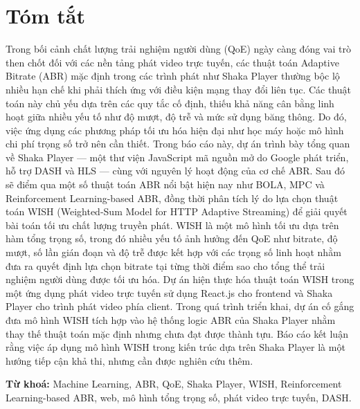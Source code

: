 \documentclass[12pt]{report}
\begin{document}
\chapter*{Tóm tắt}
Trong bối cảnh chất lượng trải nghiệm người dùng (QoE) ngày càng đóng vai trò then chốt đối với các nền tảng phát video trực tuyến, các thuật toán Adaptive Bitrate (ABR) mặc định trong các trình phát như Shaka Player thường bộc lộ nhiều hạn chế khi phải thích ứng với điều kiện mạng thay đổi liên tục. Các thuật toán này chủ yếu dựa trên các quy tắc cố định, thiếu khả năng cân bằng linh hoạt giữa nhiều yếu tố như độ mượt, độ trễ và mức sử dụng băng thông. Do đó, việc ứng dụng các phương pháp tối ưu hóa hiện đại như học máy hoặc mô hình chi phí trọng số trở nên cần thiết. Trong báo cáo này, dự án trình bày tổng quan về Shaka Player — một thư viện JavaScript mã nguồn mở do Google phát triển, hỗ trợ DASH và HLS — cùng với nguyên lý hoạt động của cơ chế ABR. Sau đó sẽ điểm qua một số thuật toán ABR nổi bật hiện nay như BOLA, MPC và Reinforcement Learning-based ABR, đồng thời phân tích lý do lựa chọn thuật toán WISH (Weighted-Sum Model for HTTP Adaptive Streaming) để giải quyết bài toán tối ưu chất lượng truyền phát. WISH là một mô hình tối ưu dựa trên hàm tổng trọng số, trong đó nhiều yếu tố ảnh hưởng đến QoE như bitrate, độ mượt, số lần gián đoạn và độ trễ được kết hợp với các trọng số linh hoạt nhằm đưa ra quyết định lựa chọn bitrate tại từng thời điểm sao cho tổng thể trải nghiệm người dùng được tối ưu hóa. Dự án hiện thực hóa thuật toán WISH trong một ứng dụng phát video trực tuyến sử dụng React.js cho frontend và Shaka Player cho trình phát video phía client. Trong quá trình triển khai, dự án cố gắng đưa mô hình WISH tích hợp vào hệ thống logic ABR của Shaka Player nhằm thay thế thuật toán mặc định nhưng chưa đạt được thành tựu. Báo cáo kết luận rằng việc áp dụng mô hình WISH trong kiến trúc dựa trên Shaka Player là một hướng tiếp cận khả thi, nhưng cần được nghiên cứu thêm.

\textbf{Từ khoá:} Machine Learning, ABR, QoE, Shaka Player, WISH, Reinforcement Learning-based ABR, web, mô hình tổng trọng số, phát video trực tuyến, DASH.

\tableofcontents



\end{document}
